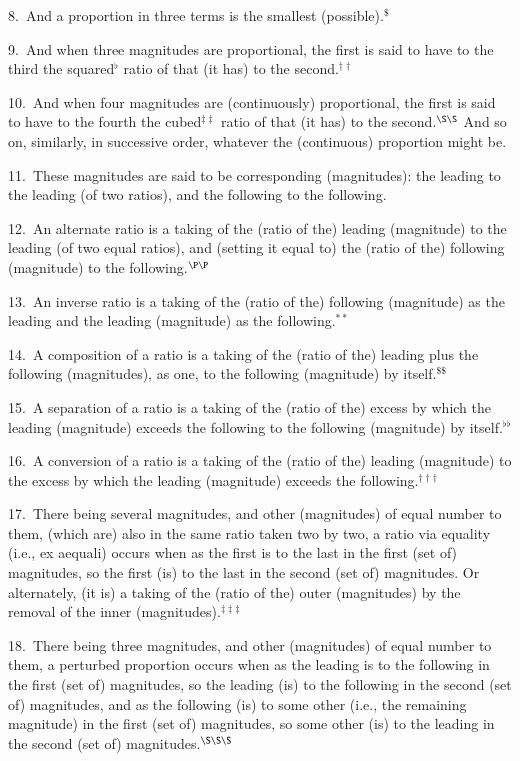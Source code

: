 \begin{Parallel}{}{}
{8.~And a  proportion in three terms is the smallest (possible).$^\$$

9.~And when three magnitudes are proportional, the first is said to
have to the third the squared$^\flat$ ratio  of that (it has) to the second.$^{\dag\dag}$

10.~And when four magnitudes are (continuously) proportional, the first is said to have to the fourth the cubed$^{\ddag\ddag}$ ratio  of that (it has) to the second.$^{\S\S}$ And  so on,   similarly, in successive order, whatever the (continuous) proportion
might be.

11.~These magnitudes are said to be corresponding (magnitudes):
the leading to the leading (of two ratios), and
the following to the following.

12.~An alternate ratio is a taking of the (ratio of the) leading  (magnitude) to the leading (of two equal ratios), and (setting it equal to) the (ratio of the)
following   (magnitude) to the following.$^{\P\P}$

13.~An inverse  ratio is a taking of the (ratio of the) following (magnitude) as the leading and the leading (magnitude) as the
following.$^{\ast\ast}$

14.~A composition of a  ratio is a taking of the (ratio of the) leading plus the following (magnitudes),
as one, to the  following (magnitude) by itself.$^{\$\$}$

 15.~A separation of a  ratio is a taking of the (ratio of the) excess by which the
 leading (magnitude) exceeds the following to the following (magnitude)
 by itself.$^{\flat\flat}$
 
16.~A conversion  of a ratio is a taking of the (ratio of the) leading (magnitude) 
 to the excess by which the leading (magnitude) exceeds the following.$^{\dag\dag\dag}$
 
17.~There being several magnitudes,
   and  other (magnitudes)
 of equal  number to them, (which are)  also in
 the same ratio taken two by two,
  a  ratio via equality (i.e.,  ex aequali) occurs when  as the first is to the last  in the first (set of) magnitudes, so  the first (is) to the last   in the second (set of) magnitudes. Or alternately, (it is) a taking of the (ratio of the) outer (magnitudes) by the removal of the 
 inner (magnitudes).$^{\ddag\ddag\ddag}$
 
18.~There being three magnitudes,
  and  other (magnitudes)
 of equal  number to them,  a  perturbed proportion occurs  when  as 
 the  leading is to the following
 in the first (set of) magnitudes, so the  leading (is) to the following  in the second (set of) magnitudes, and as   the following (is) to
 some other ({\rm i.e.}, the remaining magnitude) in the first (set of) magnitudes, so some other (is)  to the leading  in the second (set of) magnitudes.$^{\S\S\S}$}
\end{Parallel}
